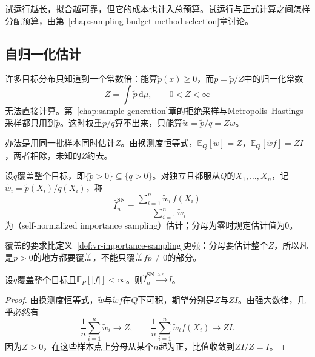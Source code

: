 试运行越长，拟合越可靠，但它的成本也计入总预算。试运行与正式计算之间怎样分配预算，由第~\ref{chap:sampling-budget-method-selection}章讨论。

\subsection{自归一化估计}
\label{sec:vr-self-normalized}

许多目标分布只知道到一个常数倍：能算$\widetilde{p}(x)\geq0$，而$p=\widetilde{p}/Z$中的归一化常数
\[
 Z=\int\widetilde{p}\,\mathrm{d}\mu,\qquad 0<Z<\infty
\]
无法直接计算。第~\ref{chap:sample-generation}章的拒绝采样与Metropolis--Hastings采样都只用到$\widetilde{p}$。这时权重$p/q$算不出来，只能算$\widetilde{w}=\widetilde{p}/q=Zw$。

办法是用同一批样本同时估计$Z$。由换测度恒等式，$\mathbb{E}_Q[\widetilde{w}]=Z$，$\mathbb{E}_Q[\widetilde{w}f]=ZI$，两者相除，未知的$Z$约去。

\begin{definition}[自归一化估计]
\label{def:vr-self-normalized}
设$q$覆盖整个目标，即$\{\widetilde{p}>0\}\subseteq\{q>0\}$。对独立且都服从$Q$的$X_1,\dots,X_n$，记$\widetilde{w}_i=\widetilde{p}(X_i)/q(X_i)$，称
\begin{equation}
 \hat{I}_n^{\mathrm{SN}}=\frac{\sum_{i=1}^{n}\widetilde{w}_i\,f(X_i)}{\sum_{i=1}^{n}\widetilde{w}_i}
 \label{eq:vr-self-normalized}
\end{equation}
为（self-normalized importance sampling）估计；分母为零时规定估计值为$0$。
\end{definition}

覆盖的要求比定义~\ref{def:vr-importance-sampling}更强：分母要估计整个$Z$，所以凡是$\widetilde{p}>0$的地方都要覆盖，不能只覆盖$f\widetilde{p}\neq0$的部分。

\begin{theorem}[自归一化估计的一致性]
\label{thm:vr-sn-consistency}
设$q$覆盖整个目标且$\mathbb{E}_P[\lvert f\rvert]<\infty$。则$\hat{I}_n^{\mathrm{SN}}\xrightarrow{\mathrm{a.s.}}I$。
\end{theorem}

\begin{proof}
由换测度恒等式，$\widetilde{w}$与$\widetilde{w}f$在$Q$下可积，期望分别是$Z$与$ZI$。由强大数律，几乎必然有
\[
 \frac1n\sum_{i=1}^{n}\widetilde{w}_i\to Z,\qquad \frac1n\sum_{i=1}^{n}\widetilde{w}_if(X_i)\to ZI .
\]
因为$Z>0$，在这些样本点上分母从某个$n$起为正，比值收敛到$ZI/Z=I$。
\end{proof}

